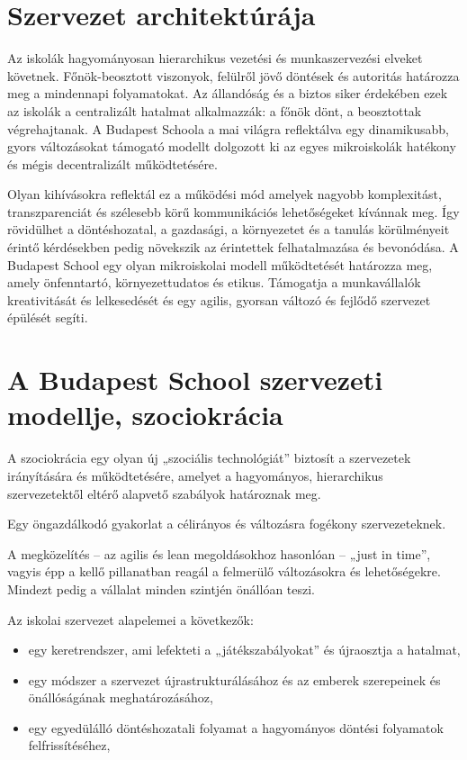 \section{Szervezet architektúrája}


Az iskolák hagyományosan hierarchikus vezetési és munkaszervezési elveket követnek. Főnök-beosztott viszonyok, felülről jövő döntések és autoritás határozza meg a mindennapi folyamatokat. Az állandóság és a biztos siker érdekében ezek az iskolák a centralizált hatalmat alkalmazzák: a főnök dönt, a beosztottak végrehajtanak. A Budapest Schoola a mai világra reflektálva egy dinamikusabb, gyors változásokat támogató modellt dolgozott ki az egyes mikroiskolák hatékony és mégis decentralizált működtetésére.

Olyan kihívásokra reflektál ez a működési mód amelyek nagyobb komplexitást, transzparenciát és szélesebb körű kommunikációs lehetőségeket kívánnak meg. Így rövidülhet a döntéshozatal, a gazdasági, a környezetet és a tanulás körülményeit érintő kérdésekben pedig növekszik az érintettek felhatalmazása és bevonódása. A Budapest School egy olyan mikroiskolai modell működtetését határozza meg, amely önfenntartó, környezettudatos és etikus. Támogatja a munkavállalók kreativitását és lelkesedését és egy agilis, gyorsan változó és fejlődő szervezet épülését segíti.


\section{A Budapest School szervezeti modellje, szociokrácia}

A szociokrácia egy olyan új „szociális technológiát” biztosít a szervezetek irányítására és működtetésére, amelyet a hagyományos, hierarchikus szervezetektől eltérő alapvető szabályok határoznak meg.

Egy öngazdálkodó gyakorlat a célirányos és változásra fogékony szervezeteknek.

A megközelítés – az agilis és lean megoldásokhoz hasonlóan – „just in time”, vagyis épp a kellő pillanatban reagál a felmerülő változásokra és lehetőségekre. Mindezt pedig a vállalat minden szintjén önállóan teszi.

Az iskolai szervezet alapelemei a következők:
\begin{itemize}
    \item egy keretrendszer, ami lefekteti a „játékszabályokat” és újraosztja a hatalmat,
    \item egy módszer a szervezet újrastrukturálásához és az emberek szerepeinek és önállóságának meghatározásához,
    \item egy egyedülálló döntéshozatali folyamat a hagyományos döntési folyamatok felfrissítéséhez,
\end{itemize}

